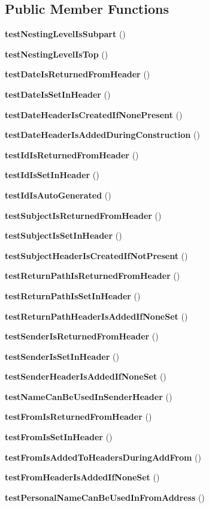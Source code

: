 \subsection*{Public Member Functions}
\begin{DoxyCompactItemize}
\item 
{\bf test\+Nesting\+Level\+Is\+Subpart} ()
\item 
{\bf test\+Nesting\+Level\+Is\+Top} ()
\item 
{\bf test\+Date\+Is\+Returned\+From\+Header} ()
\item 
{\bf test\+Date\+Is\+Set\+In\+Header} ()
\item 
{\bf test\+Date\+Header\+Is\+Created\+If\+None\+Present} ()
\item 
{\bf test\+Date\+Header\+Is\+Added\+During\+Construction} ()
\item 
{\bf test\+Id\+Is\+Returned\+From\+Header} ()
\item 
{\bf test\+Id\+Is\+Set\+In\+Header} ()
\item 
{\bf test\+Id\+Is\+Auto\+Generated} ()
\item 
{\bf test\+Subject\+Is\+Returned\+From\+Header} ()
\item 
{\bf test\+Subject\+Is\+Set\+In\+Header} ()
\item 
{\bf test\+Subject\+Header\+Is\+Created\+If\+Not\+Present} ()
\item 
{\bf test\+Return\+Path\+Is\+Returned\+From\+Header} ()
\item 
{\bf test\+Return\+Path\+Is\+Set\+In\+Header} ()
\item 
{\bf test\+Return\+Path\+Header\+Is\+Added\+If\+None\+Set} ()
\item 
{\bf test\+Sender\+Is\+Returned\+From\+Header} ()
\item 
{\bf test\+Sender\+Is\+Set\+In\+Header} ()
\item 
{\bf test\+Sender\+Header\+Is\+Added\+If\+None\+Set} ()
\item 
{\bf test\+Name\+Can\+Be\+Used\+In\+Sender\+Header} ()
\item 
{\bf test\+From\+Is\+Returned\+From\+Header} ()
\item 
{\bf test\+From\+Is\+Set\+In\+Header} ()
\item 
{\bf test\+From\+Is\+Added\+To\+Headers\+During\+Add\+From} ()
\item 
{\bf test\+From\+Header\+Is\+Added\+If\+None\+Set} ()
\item 
{\bf test\+Personal\+Name\+Can\+Be\+Used\+In\+From\+Address} ()

\end{DoxyCompactItemize}
